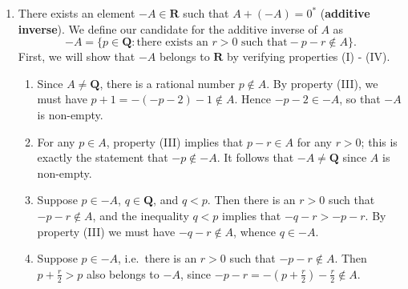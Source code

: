 \documentclass[12pt]{article}
\newcommand{\Q}{\mathbf{Q}}
\newcommand{\R}{\mathbf{R}}
\theoremstyle{definition}
\begin{document}
\begin{enumerate}[label = (A\arabic*)]
    \item There exists an element \( -A \in \R \) such that \( A + (-A) = 0^* \) (\textbf{additive inverse}). We define our candidate for the additive inverse of \( A \) as
    \[
        -A = \{ p \in \Q : \text{there exists an } r > 0 \text{ such that} -p - r \not\in A \}.
    \]
    First, we will show that \( -A \) belongs to \( \R \) by verifying properties (I) - (IV).

    \begin{enumerate}[label = (\Roman*)]
        \item Since \( A \neq \Q \), there is a rational number \( p \not\in A \). By property (III), we must have \( p + 1 = -(-p - 2) - 1 \not\in A \). Hence \( -p - 2 \in -A \), so that \( -A \) is non-empty.
        
        \item For any \( p \in A \), property (III) implies that \( p - r \in A \) for any \( r > 0 \); this is exactly the statement that \( -p \not\in -A \). It follows that \( -A \neq \Q \) since \( A \) is non-empty.
        
        \item Suppose \( p \in -A \), \( q \in \Q \), and \( q < p \). Then there is an \( r > 0 \) such that \( -p - r \not\in A \), and the inequality \( q < p \) implies that \( -q - r > -p - r \). By property (III) we must have \( -q - r \not\in A \), whence \( q \in -A \).
        
        \item Suppose \( p \in -A \), i.e.\ there is an \( r > 0 \) such that \( -p - r \not\in A \). Then \( p + \frac{r}{2} > p \) also belongs to \( -A \), since \( -p - r = -\left(p + \frac{r}{2}\right) - \frac{r}{2} \not\in A \).
    \end{enumerate}
    

\end{enumerate}
\end{document}
